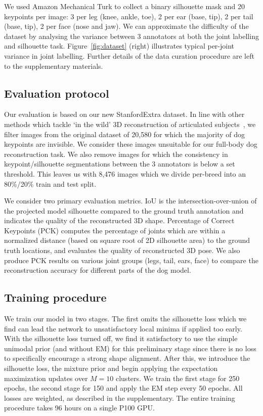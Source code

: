   We used Amazon Mechanical Turk to collect a binary silhouette mask and 20 keypoints per image: 3 per leg (knee, ankle, toe), 2 per ear (base, tip), 2 per tail (base, tip), 2 per face (nose and jaw). We can approximate the difficulty of the dataset by analysing the variance between 3 annotators at both the joint labelling and silhouette task. Figure~\ref{fig:dataset} (right) illustrates typical per-joint variance in joint labelling. Further details of the data curation procedure are left to the supplementary materials. 
  
  \subsection{Evaluation protocol}
  
  Our evaluation is based on our new StanfordExtra dataset. In line with other methods which tackle `in the wild' 3D reconstruction of articulated subjects~\cite{kolotouros2019learning,kolotouros19convolutional}, we filter images from the original dataset of 20,580 for which the majority of dog keypoints are invisible. We consider these images unsuitable for our full-body dog reconstruction task. We also remove images for which the consistency in keypoint/silhouette segmentations between the 3 annotators is below a set threshold. This leaves us with 8,476 images which we divide per-breed into an 80\%/20\% train and test split.
  
  We consider two primary evaluation metrics. IoU is the intersection-over-union of the projected model silhouette compared to the ground truth annotation and indicates the quality of the reconstructed 3D shape. Percentage of Correct Keypoints (PCK) computes the percentage of joints which are within a normalized distance (based on square root of 2D silhouette area) to the ground truth locations, and evaluates the quality of reconstructed 3D pose. We also produce PCK results on various joint groups (legs, tail, ears, face) to compare the reconstruction accuracy for different parts of the dog model.
  
  \subsection{Training procedure}
  
  We train our model in two stages. The first omits the silhouette loss which we find can lead the network to unsatisfactory local minima if applied too early. With the silhouette loss turned off, we find it satisfactory to use the simple unimodal prior (and without EM) for this preliminary stage since there is no loss to specifically encourage a strong shape alignment. After this, we introduce the silhouette loss, the mixture prior and begin applying the expectation maximization updates over $M=10$ clusters. We train the first stage for 250 epochs, the second stage for 150 and apply the EM step every 50 epochs. All losses are weighted, as described in the supplementary. The entire training procedure takes 96 hours on a single P100 GPU.
  
